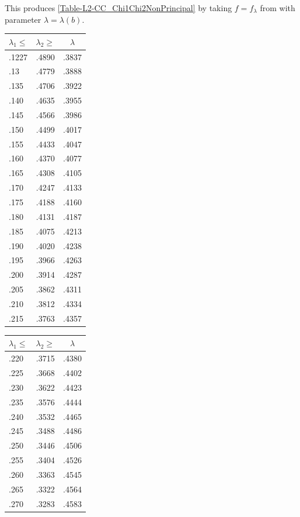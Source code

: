 \documentclass[12pt,psamsfonts]{amsart}
\theoremstyle{definition}
\theoremstyle{remark}
\numberwithin{equation}{section}
\begin{document}
This produces \cref{Table-L2-CC_Chi1Chi2NonPrincipal} by taking $f = f_{\lambda}$ from \cite[Lemma 7.2]{HBLinnik} with parameter $\lambda = \lambda(b)$.  
\begin{table}
\begin{tabular}{l|c|c} 
 $\lambda_1 \leq$ & $\lambda_2 \geq$ & $\lambda$ \\ 
 \hline 
 .1227 &  .4890 &  .3837 \\ 
 .13 &  .4779 &  .3888 \\ 
 .135 &  .4706 &  .3922 \\ 
 .140 &  .4635 &  .3955 \\ 
 .145 &  .4566 &  .3986 \\ 
 .150 &  .4499 &  .4017 \\ 
 .155 &  .4433 &  .4047 \\ 
 .160 &  .4370 &  .4077 \\ 
 .165 &  .4308 &  .4105 \\ 
 .170 &  .4247 &  .4133 \\ 
 .175 &  .4188 &  .4160 \\ 
 .180 &  .4131 &  .4187 \\ 
 .185 &  .4075 &  .4213 \\ 
 .190 &  .4020 &  .4238 \\ 
 .195 &  .3966 &  .4263 \\ 
 .200 &  .3914 &  .4287 \\ 
 .205 &  .3862 &  .4311 \\ 
  .210 &  .3812 &  .4334 \\ 
   .215 &  .3763 &  .4357 \\ 
 \end{tabular}
 \qquad
 \begin{tabular}{l|c|c} 
 $\lambda_1 \leq$ & $\lambda_2 \geq$ & $\lambda$ \\ 
 \hline 
 .220 &  .3715 &  .4380 \\ 
 .225 &  .3668 &  .4402 \\ 
 .230 &  .3622 &  .4423 \\ 
 .235 &  .3576 &  .4444 \\ 
 .240 &  .3532 &  .4465 \\ 
 .245 &  .3488 &  .4486 \\ 
 .250 &  .3446 &  .4506 \\ 
 .255 &  .3404 &  .4526 \\ 
 .260 &  .3363 &  .4545 \\ 
 .265 &  .3322 &  .4564 \\ 
 .270 &  .3283 &  .4583 \\ 

\end{tabular}
\end{table}
\end{document}
